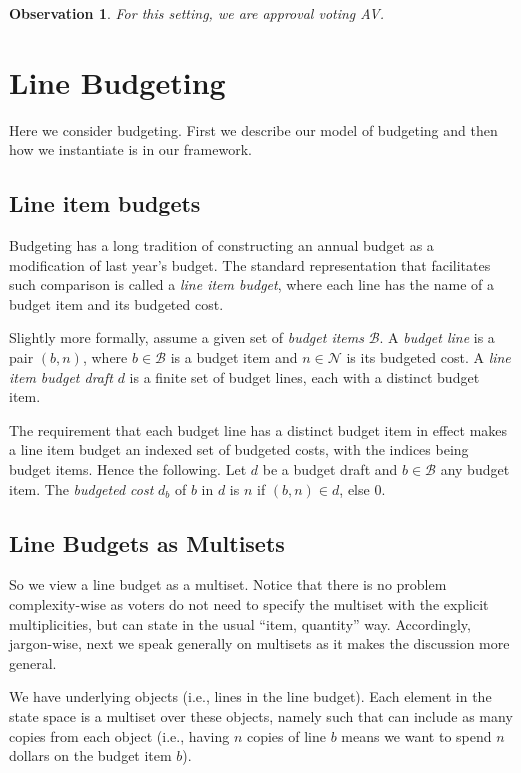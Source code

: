 \documentclass{llncs}
\newtheorem{observation}{Observation}
\newcommand{\calB}{\mathcal{B}}
\begin{document}
\begin{observation}
For this setting, we are approval voting AV.
\end{observation}


\section{Line Budgeting}
\label{section:e-process budgeting}

Here we consider budgeting. First we describe our model of budgeting and then how we instantiate is in our framework.


\subsection{Line item budgets}

Budgeting has a long tradition of constructing an annual budget as a modification of last year's budget.  The standard representation that facilitates such comparison is called a \emph{line item budget}, where each line has the name of a budget item and its budgeted cost.

Slightly more formally,
assume a given set of \emph{budget items} $\calB$. A \emph{budget line} is a pair $(b,n)$, where $b \in \calB$ is a budget item and $n \in \mathcal{N}$ is its budgeted cost.  A \emph{line item budget draft} $d$ is a finite set of budget lines, each with a distinct budget item.

The requirement that each budget line has a distinct budget item in effect makes a line item budget an indexed set of budgeted costs, with the indices being
budget items.  Hence the following.
Let $d$ be a budget draft and $b \in \calB$  any budget item. The \emph{budgeted cost} $d_b$ of $b$ in $d$ is $n$ if $(b,n) \in d$, else 0.


\subsection{Line Budgets as Multisets}

So we view a line budget as a multiset. Notice that there is no problem complexity-wise as voters do not need to specify the multiset with the explicit multiplicities, but can state in the usual ``item, quantity'' way.
Accordingly, jargon-wise, next we speak generally on multisets as it makes the discussion more general.

We have underlying objects (i.e., lines in the line budget). Each element in the state space is a multiset over these objects, namely such that can include as many copies from each object (i.e., having $n$ copies of line $b$ means we want to spend $n$ dollars on the budget item $b$). 
\end{document}
